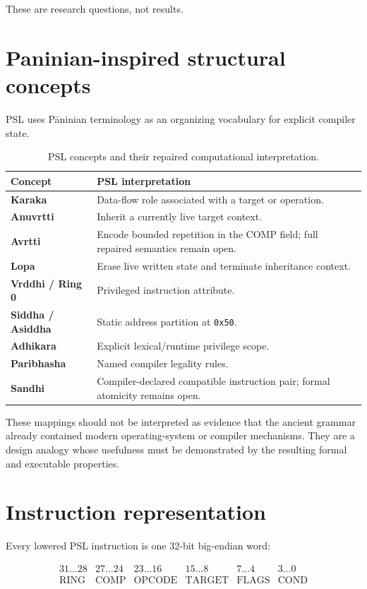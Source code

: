 \documentclass[11pt,a4paper]{article}
\begin{document}
These are research questions, not results.

\section{Paninian-inspired structural concepts}

PSL uses P\={a}ninian terminology as an organizing vocabulary for explicit
compiler state.

\begin{table}[h]
\centering
\caption{PSL concepts and their repaired computational interpretation.}
\begin{tabularx}{\linewidth}{>{\bfseries}p{3.0cm} X}
\toprule
Concept & PSL interpretation \\
\midrule
Karaka & Data-flow role associated with a target or operation. \\
Anuvrtti & Inherit a currently live target context. \\
Avrtti & Encode bounded repetition in the COMP field; full repaired semantics
         remain open. \\
Lopa & Erase live written state and terminate inheritance context. \\
Vrddhi / Ring 0 & Privileged instruction attribute. \\
Siddha / Asiddha & Static address partition at \texttt{0x50}. \\
Adhikara & Explicit lexical/runtime privilege scope. \\
Paribhasha & Named compiler legality rules. \\
Sandhi & Compiler-declared compatible instruction pair; formal atomicity
         remains open. \\
\bottomrule
\end{tabularx}
\end{table}

These mappings should not be interpreted as evidence that the ancient grammar
already contained modern operating-system or compiler mechanisms. They are a
design analogy whose usefulness must be demonstrated by the resulting formal
and executable properties.

\section{Instruction representation}

Every lowered PSL instruction is one 32-bit big-endian word:

\[
\begin{array}{c|c|c|c|c|c}
31\ldots28 & 27\ldots24 & 23\ldots16 & 15\ldots8 & 7\ldots4 & 3\ldots0 \\
\hline
\mathrm{RING} & \mathrm{COMP} & \mathrm{OPCODE} &
\mathrm{TARGET} & \mathrm{FLAGS} & \mathrm{COND}
\end{array}
\]
\end{document}
